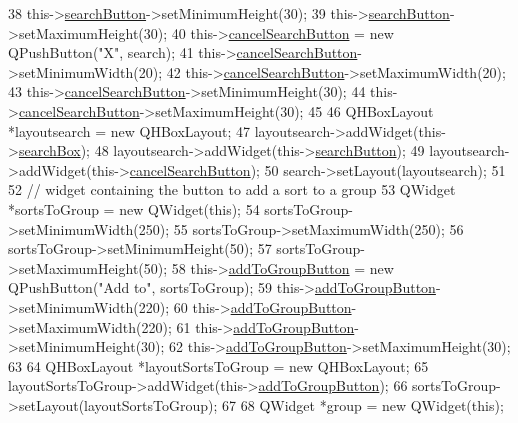 \begin{DoxyCode}
38     this->\hyperlink{classTreeArea_a682ba9e29364cbfca7ad726a6a630907}{searchButton}->setMinimumHeight(30);
39     this->\hyperlink{classTreeArea_a682ba9e29364cbfca7ad726a6a630907}{searchButton}->setMaximumHeight(30);
40     this->\hyperlink{classTreeArea_a740ea34ee424f43171bcdd69125e515e}{cancelSearchButton} = \textcolor{keyword}{new} QPushButton(\textcolor{stringliteral}{"X"}, search);
41     this->\hyperlink{classTreeArea_a740ea34ee424f43171bcdd69125e515e}{cancelSearchButton}->setMinimumWidth(20);
42     this->\hyperlink{classTreeArea_a740ea34ee424f43171bcdd69125e515e}{cancelSearchButton}->setMaximumWidth(20);
43     this->\hyperlink{classTreeArea_a740ea34ee424f43171bcdd69125e515e}{cancelSearchButton}->setMinimumHeight(30);
44     this->\hyperlink{classTreeArea_a740ea34ee424f43171bcdd69125e515e}{cancelSearchButton}->setMaximumHeight(30);
45 
46     QHBoxLayout *layoutsearch = \textcolor{keyword}{new} QHBoxLayout;
47     layoutsearch->addWidget(this->\hyperlink{classTreeArea_a609dd67c5b1d7bb8d0661054338f9561}{searchBox});
48     layoutsearch->addWidget(this->\hyperlink{classTreeArea_a682ba9e29364cbfca7ad726a6a630907}{searchButton});
49     layoutsearch->addWidget(this->\hyperlink{classTreeArea_a740ea34ee424f43171bcdd69125e515e}{cancelSearchButton});
50     search->setLayout(layoutsearch);
51 
52     \textcolor{comment}{// widget containing the button to add a sort to a group}
53     QWidget *sortsToGroup = \textcolor{keyword}{new} QWidget(\textcolor{keyword}{this});
54     sortsToGroup->setMinimumWidth(250);
55     sortsToGroup->setMaximumWidth(250);
56     sortsToGroup->setMinimumHeight(50);
57     sortsToGroup->setMaximumHeight(50);
58     this->\hyperlink{classTreeArea_ab77bb00c229d79b09736ff7948f1fc32}{addToGroupButton} = \textcolor{keyword}{new} QPushButton(\textcolor{stringliteral}{"Add to"}, sortsToGroup);
59     this->\hyperlink{classTreeArea_ab77bb00c229d79b09736ff7948f1fc32}{addToGroupButton}->setMinimumWidth(220);
60     this->\hyperlink{classTreeArea_ab77bb00c229d79b09736ff7948f1fc32}{addToGroupButton}->setMaximumWidth(220);
61     this->\hyperlink{classTreeArea_ab77bb00c229d79b09736ff7948f1fc32}{addToGroupButton}->setMinimumHeight(30);
62     this->\hyperlink{classTreeArea_ab77bb00c229d79b09736ff7948f1fc32}{addToGroupButton}->setMaximumHeight(30);
63 
64     QHBoxLayout *layoutSortsToGroup = \textcolor{keyword}{new} QHBoxLayout;
65     layoutSortsToGroup->addWidget(this->\hyperlink{classTreeArea_ab77bb00c229d79b09736ff7948f1fc32}{addToGroupButton});
66     sortsToGroup->setLayout(layoutSortsToGroup);
67 
68     QWidget *group = \textcolor{keyword}{new} QWidget(\textcolor{keyword}{this});

\end{DoxyCode}

